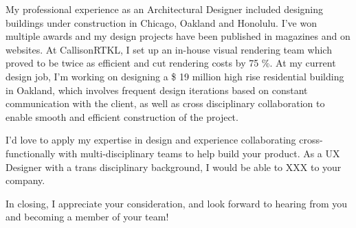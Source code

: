 \documentclass[11pt, a4paper]{awesome-cv}
\begin{document}
\begin{cvletter}
My professional experience as an Architectural Designer included designing buildings under construction in Chicago, Oakland and Honolulu. I've won multiple awards and my design projects have been published in magazines and on websites. At CallisonRTKL, I set up an in-house visual rendering team which proved to be twice as efficient and cut rendering costs by 75 \%. At my current design job, I'm working on designing a \$ 19 million high rise residential building in Oakland, which involves frequent design iterations based on constant communication with the client, as well as cross disciplinary collaboration to enable smooth and efficient construction of the project.

I'd love to apply my expertise in design and experience collaborating cross-functionally with multi-disciplinary teams to help build your product. As a UX Designer with a trans disciplinary background, I would be able to XXX to your company.

In closing, I appreciate your consideration, and look forward to hearing from you and becoming a member of your team!



\end{cvletter}


\makeletterclosing
\end{document}
